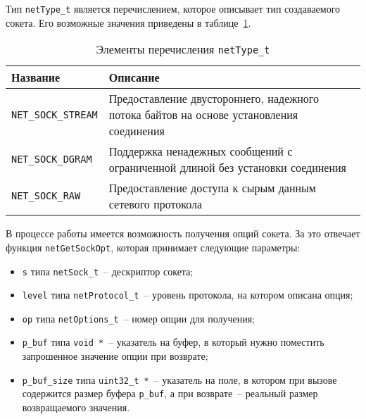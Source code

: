 
Тип \lstinline{netType_t} является перечислением, которое описывает тип создаваемого
сокета. Его возможные значения приведены в таблице~\ref{table:func:netType}.

\begin{table}[ht]
    \caption{Элементы перечисления \lstinline{netType_t}}
    \label{table:func:netType}
    \begin{tabular}{| >{\raggedright}m{}
                    | >{\raggedright\arraybackslash}m{}|}
        \hline
        \centering Название & \centering\arraybackslash Описание \\

        \hline
        \lstinline[]$NET_SOCK_STREAM$ &
        Предоставление двустороннего, надежного потока байтов на основе установления соединения
        \\

        \hline
        \lstinline[]$NET_SOCK_DGRAM$ &
        Поддержка ненадежных сообщений с ограниченной длиной без установки соединения
        \\

        \hline
        \lstinline[]$NET_SOCK_RAW$ &
        Предоставление доступа к сырым данным сетевого протокола
        \\

        \hline
    \end{tabular}
\end{table}

В процессе работы имеется возможность получения опций сокета. За это отвечает функция \lstinline{netGetSockOpt}, которая принимает следующие параметры:

\begin{itemize}
    \item \lstinline{s} типа \lstinline{netSock_t}~-- дескриптор сокета;
    \item \lstinline{level} типа \lstinline{netProtocol_t}~-- уровень протокола, на котором описана опция;
    \item \lstinline{op} типа \lstinline{netOptions_t}~-- номер опции для получения;
    \item \lstinline{p_buf} типа \lstinline{void *}~-- указатель на буфер, в который нужно поместить запрошенное значение опции при возврате;
    \item \lstinline{p_buf_size} типа \lstinline{uint32_t *}~-- указатель на поле, в котором при вызове содержится размер буфера
    \lstinline{p_buf}, а при возврате~-- реальный размер возвращаемого значения.
\end{itemize}

